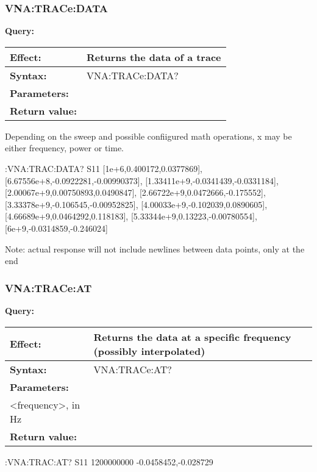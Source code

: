\documentclass[a4paper,11pt]{article}
\newcommand{\query}[4]{
\noindent\textbf{Query:}
\begin{longtable}{p{.15\textwidth} | p{.80\textwidth} } 
\hline
\textbf{Effect:} & #1 \\ \hline
\textbf{Syntax:} & #2 \\ \hline 
\textbf{Parameters:} & \makecell[tl]{#3} \\ \hline
\textbf{Return value:} & \makecell[tl]{#4} \\ \hline
\end{longtable}
}
\begin{document}
\subsubsection{VNA:TRACe:DATA}
\query{Returns the data of a trace}{VNA:TRACe:DATA?}{<trace>, either by name or by index}{comma-separated list of tuples [x, real(y), imag(y]}
Depending on the sweep and possible confiigured math operations, x may be either frequency, power or time.
\begin{example}
:VNA:TRAC:DATA? S11
[1e+6,0.400172,0.0377869],
[6.67556e+8,-0.0922281,-0.00990373],
[1.33411e+9,-0.0341439,-0.0331184],
[2.00067e+9,0.00750893,0.0490847],
[2.66722e+9,0.0472666,-0.175552],
[3.33378e+9,-0.106545,-0.00952825],
[4.00033e+9,-0.102039,0.0890605],
[4.66689e+9,0.0464292,0.118183],
[5.33344e+9,0.13223,-0.00780554],
[6e+9,-0.0314859,-0.246024]
\end{example}
\vspace{-0.3cm}
\begin{center}
\footnotesize{Note: actual response will not include newlines between data points, only at the end}
\end{center}

\subsubsection{VNA:TRACe:AT}
\query{Returns the data at a specific frequency (possibly interpolated)}{VNA:TRACe:AT?}{<trace>, either by name or by index\\<frequency>, in Hz}{real,imag (or ``NaN,NaN'' if specified frequeny is invalid)}
\begin{example}
:VNA:TRAC:AT? S11 1200000000
-0.0458452,-0.028729
\end{example}
\end{document}
